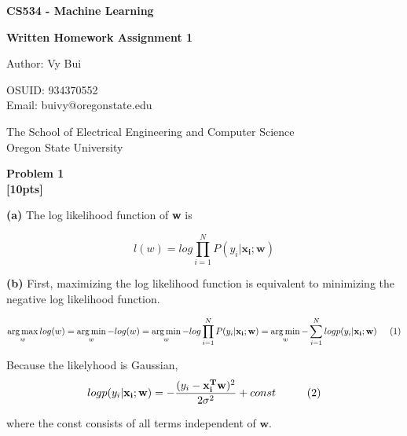 \documentclass[12pt,article]{article}
\DeclareMathOperator*{\argmax}{arg\,max}
\DeclareMathOperator*{\argmin}{arg\,min}
\newcommand\projnumber{1}
\newcommand\tab[1][1cm]{\hspace*{#1}}
\newenvironment{problem}[2][Problem]
    { \begin{mdframed}[backgroundcolor=gray!20] \textbf{#1 #2} \\}
    {  \end{mdframed}}
\begin{document}
\begin{titlepage}
    \begin{center}
        \vspace*{4cm}

        \textbf{\Large CS534 - Machine Learning}

        \vspace{0.5cm}
 
        \textbf{\Large Written Homework Assignment \projnumber{}}
 
        \vspace{1cm}

        Author: Vy Bui

        OSUID: 934370552 \\ 
        
        Email: buivy@oregonstate.edu

        \vfill
             
        \vspace{0.8cm}
      
             
        The School of Electrical Engineering and Computer Science\\
        Oregon State University\\
             
    \end{center}
\end{titlepage}

\begin{problem}{1}
\textbf{[10pts]}
\end{problem}

\textbf{(a)} The log likelihood function of \textbf{w} is 

$$l(w) = log\prod_{i=1}^{N} P(y_i | \mathbf{x_i; w})$$

\textbf{(b)} \newline
First, maximizing the log likelihood function is equivalent to minimizing the 
negative log likelihood function.

$$\argmax_{w} log(w) = \argmin_{w} -log(w) 
= \argmin_{w} -log\prod_{i=1}^{N} P(y_i | \mathbf{x_i; w})
= \argmin_{w} -\sum_{i=1}^{N} log p(y_i | \mathbf{x_i; w}) \tab[0.5cm] (1)$$

Because the likelyhood is Gaussian,
$$log p(y_i | \mathbf{x_i; w}) = -\frac{(y_i - \mathbf{x_i^Tw})^2}{2\sigma^2} + const \tab[1cm] (2)$$

where the const consists of all terms independent of $\mathbf{w}$.
\end{document}
